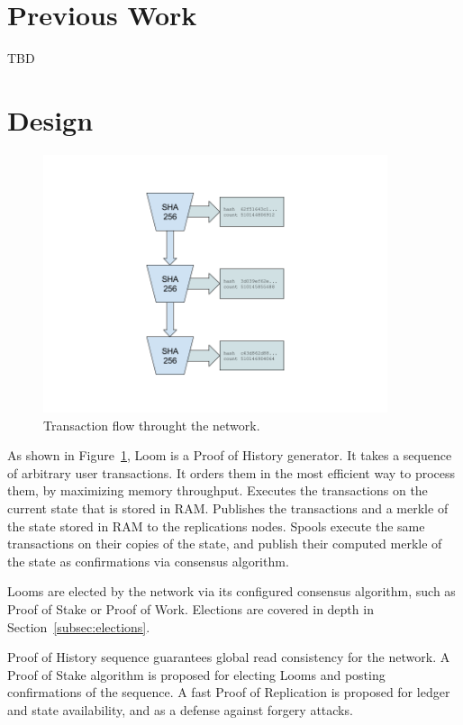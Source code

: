 \documentclass[12pt]{article}
\begin{document}
\section{Previous Work}\label{previous work}
TBD
\section{Design}\label{design}

\begin{figure}
  \begin{center}
    \centering
    \includegraphics[width=0.9\textwidth]{figures/fig_1.png}
    \caption[Fig 1]{Transaction flow throught the network.\label{fig:design}}
  \end{center}
  \end{figure}

As shown in Figure~\ref{fig:design}, Loom is a Proof of History generator.  It takes a sequence of arbitrary user transactions.  It orders them in the most efficient way to process them, by maximizing memory throughput.  Executes the transactions on the current state that is stored in RAM.  Publishes the transactions and a merkle of the state stored in RAM to the replications nodes.  Spools execute the same transactions on their copies of the state, and publish their computed merkle of the state as confirmations via consensus algorithm.

Looms are elected by the network via its configured consensus algorithm, such as Proof of Stake or Proof of Work.  Elections are covered in depth in Section~\ref{subsec:elections}.

Proof of History sequence guarantees global read consistency for the network.  A Proof of Stake algorithm is proposed for electing Looms and posting confirmations of the sequence.  A fast Proof of Replication is proposed for ledger and state availability, and as a defense against forgery attacks.
\end{document}
